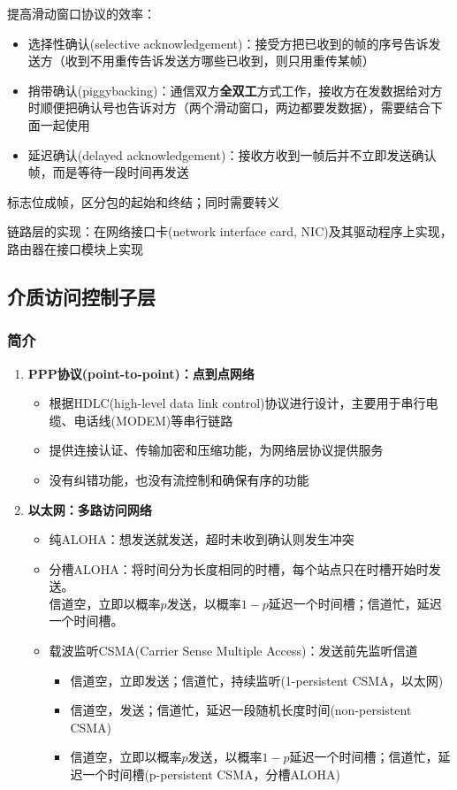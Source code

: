 提高滑动窗口协议的效率：
\begin{itemize}
	\item 选择性确认(selective acknowledgement)：接受方把已收到的帧的序号告诉发送方（收到不用重传告诉发送方哪些已收到，则只用重传某帧）
	\item 捎带确认(piggybacking)：通信双方\textbf{全双工}方式工作，接收方在发数据给对方时顺便把确认号也告诉对方（两个滑动窗口，两边都要发数据），需要结合下面一起使用
	\item 延迟确认(delayed acknowledgement)：接收方收到一帧后并不立即发送确认帧，而是等待一段时间再发送
\end{itemize}

标志位成帧，区分包的起始和终结；同时需要转义

链路层的实现：在网络接口卡(network interface card, NIC)及其驱动程序上实现，路由器在接口模块上实现

\subsection{介质访问控制子层}
\subsubsection{简介}
\begin{enumerate}
\item \textbf{PPP协议(point-to-point)：点到点网络}
\begin{itemize}
	\item 根据HDLC(high-level data link control)协议进行设计，主要用于串行电缆、电话线(MODEM)等串行链路
	\item 提供连接认证、传输加密和压缩功能，为网络层协议提供服务
	\item 没有纠错功能，也没有流控制和确保有序的功能
\end{itemize}

\item \textbf{以太网：多路访问网络}
\begin{itemize}
\item 纯ALOHA：想发送就发送，超时未收到确认则发生冲突
\item 分槽ALOHA：将时间分为长度相同的时槽，每个站点只在时槽开始时发送。\\
信道空，立即以概率$p$发送，以概率$1-p$延迟一个时间槽；信道忙，延迟一个时间槽。
\item 载波监听CSMA(Carrier Sense Multiple Access)：发送前先监听信道
\begin{itemize}
	\item 信道空，立即发送；信道忙，持续监听(1-persistent CSMA，以太网)
	\item 信道空，发送；信道忙，延迟一段随机长度时间(non-persistent CSMA)
	\item 信道空，立即以概率$p$发送，以概率$1-p$延迟一个时间槽；信道忙，延迟一个时间槽(p-persistent CSMA，分槽ALOHA)
\end{itemize}
\end{itemize}
\end{enumerate}

